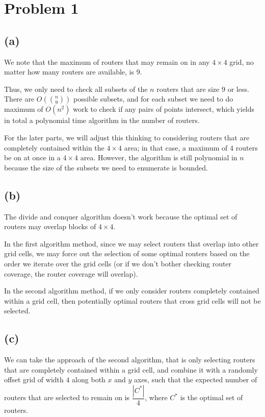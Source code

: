 \documentclass{6046}
\author{Matthew Feng}
\begin{document}
\section*{Problem 1}
\subsection*{(a)}
We note that the maximum of routers that
may remain on in any $4 \times 4$ grid,
no matter how many routers are available,
is $9$.

Thus, we only need to check all subsets of the
$n$ routers that are size $9$ or less. There
are $O(\binom{n}{9})$ possible subsets, and
for each subset we need to do maximum of $O(n^2)$
work to check if any pairs of points intersect,
which yields in total a polynomial time algorithm
in the number of routers.

For the later parts, we will adjust this
thinking to considering routers that are
completely contained within the $4 \times 4$
area; in that case, a maximum of $4$ routers
be on at once in a $4 \times 4$ area.
However, the algorithm is still polynomial
in $n$ because the size of the subsets
we need to enumerate is bounded.

\subsection*{(b)}
The divide and conquer algorithm doesn't work
because the optimal set of routers may
overlap blocks of $4 \times 4$.

In the first algorithm method, since
we may select routers that overlap into other
grid cells, we may force out the selection
of some optimal routers based on the order
we iterate over the grid cells (or
if we don't bother checking router
coverage, the router coverage will overlap).

In the second algorithm method,
if we only consider routers completely contained
within a grid cell, then potentially optimal routers
that cross grid cells will not be selected.

\subsection*{(c)}
We can take the approach of the second algorithm, 
that is only selecting routers that are completely
contained within a grid cell, and combine it with
a randomly offset grid of width $4$ along both $x$ and $y$
axes, such that the expected number of
routers that are selected to
remain on is $\dfrac{|C^*|}{4}$,
where $C^*$ is the optimal set of
routers.
\end{document}
